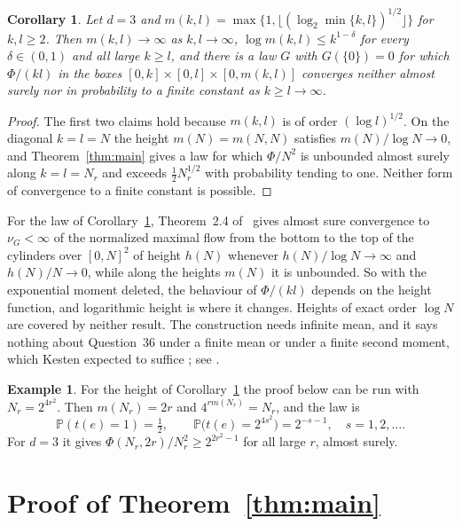\documentclass[11pt]{amsart}
\newtheorem{corollary}[theorem]{Corollary}
\theoremstyle{definition}
\newtheorem{example}[theorem]{Example}
\theoremstyle{remark}
\renewcommand{\P}{\mathbb{P}}
\begin{document}
\begin{corollary}\label{cor:adh}
Let $d=3$ and $m(k,l)=\max\{1,\lfloor(\log_2\min\{k,l\})^{1/2}\rfloor\}$ for $k,l\ge2$. Then $m(k,l)\to\infty$ as $k,l\to\infty$, $\log m(k,l)\le k^{1-\delta}$ for every $\delta\in(0,1)$ and all large $k\ge l$, and there is a law $G$ with $G(\{0\})=0$ for which $\Phi/(kl)$ in the boxes $[0,k]\times[0,l]\times[0,m(k,l)]$ converges neither almost surely nor in probability to a finite constant as $k\ge l\to\infty$.
\end{corollary}

\begin{proof}
The first two claims hold because $m(k,l)$ is of order $(\log l)^{1/2}$. On the diagonal $k=l=N$ the height $m(N)=m(N,N)$ satisfies $m(N)/\log N\to0$, and Theorem~\ref{thm:main} gives a law for which $\Phi/N^2$ is unbounded almost surely along $k=l=N_r$ and exceeds $\frac12N_r^{1/2}$ with probability tending to one. Neither form of convergence to a finite constant is possible.
\end{proof}

For the law of Corollary~\ref{cor:adh}, Theorem~2.4 of~\cite{RT18} gives almost sure convergence to $\nu_G<\infty$ of the normalized maximal flow from the bottom to the top of the cylinders over $[0,N]^2$ of height $h(N)$ whenever $h(N)/\log N\to\infty$ and $h(N)/N\to0$, while along the heights $m(N)$ it is unbounded. So with the exponential moment deleted, the behaviour of $\Phi/(kl)$ depends on the height function, and logarithmic height is where it changes. Heights of exact order $\log N$ are covered by neither result. The construction needs infinite mean, and it says nothing about Question~36 under a finite mean or under a finite second moment, which Kesten expected to suffice \cite[Open problem~2.24]{Ke}; see \cite[Remark~3]{Zh}.

\begin{example}\label{ex:explicit}
For the height of Corollary~\ref{cor:adh} the proof below can be run with $N_r=2^{4r^2}$. Then $m(N_r)=2r$ and $4^{rm(N_r)}=N_r$, and the law is
\[
\P(t(e)=1)=\tfrac12,\qquad \P\bigl(t(e)=2^{4s^2}\bigr)=2^{-s-1},\quad s=1,2,\dots .
\]
For $d=3$ it gives $\Phi(N_r,2r)/N_r^2\ge2^{2r^2-1}$ for all large $r$, almost surely.
\end{example}

\section{Proof of Theorem~\ref{thm:main}}
\end{document}
